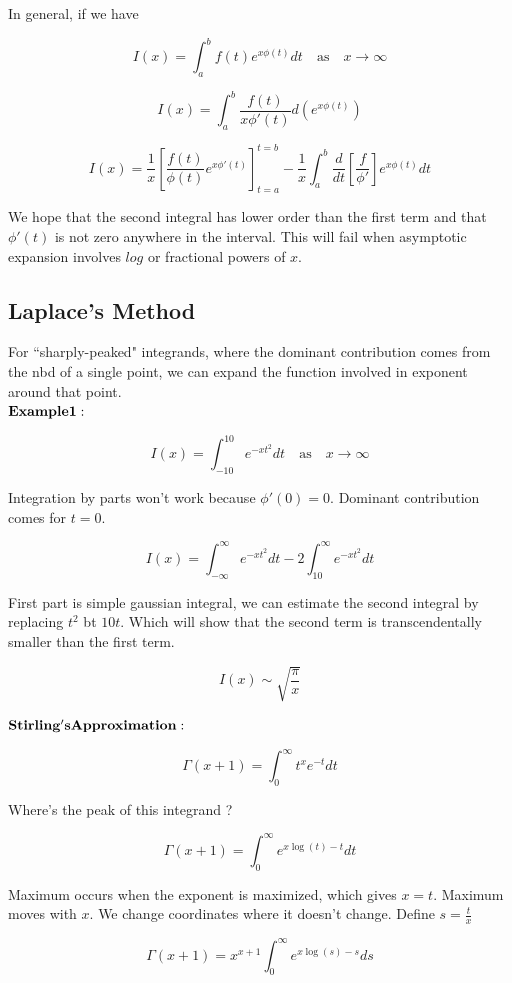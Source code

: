 \documentclass{report}
\begin{document}
\noindent In general, if we have

$$I(x) = \int_{a}^{b} f(t) e^{x\phi(t)} dt \quad\mathrm{as}\quad x\to\infty$$ 

$$I(x) = \int_{a}^{b} \frac{f(t)}{x\phi'(t)} d(e^{x\phi(t)})$$

$$I(x) = \frac{1}{x} \left[\frac{f(t)}{\phi(t)} e^{x\phi'(t)}\right]_{t=a}^{t=b} - \frac{1}{x}\int_{a}^{b}\frac {d}{dt}\left[\frac{f}{\phi'}\right]e^{x\phi(t)}dt $$

We hope that the second integral has lower order than the first term and that $\phi'(t)$ is not zero anywhere in the interval. This will fail when asymptotic expansion involves $log$ or fractional powers of $x$.

\subsection{Laplace's Method}

For ``sharply-peaked" integrands, where the dominant contribution comes from the nbd of a single point, we can expand the function involved in exponent around that point.\\

\noindent $\bold{Example 1 :}$

$$ I(x) = \int_{-10}^{10}e^{-xt^2}dt \quad\mathrm{as}\quad x\to\infty$$

\noindent Integration by parts won't work because $\phi'(0) = 0$. Dominant contribution comes for $t=0$. 

$$I(x) = \int_{-\infty}^{\infty}e^{-xt^2}dt - 2\int_{10}^{\infty}e^{-xt^2}dt$$

\noindent First part is simple gaussian integral, we can estimate the second integral by replacing $t^2$ bt $10t$. Which will show that the second term is transcendentally smaller than the first term.

$$I(x) \sim \sqrt{\frac{\pi}{x}}$$

\noindent $\bold{Stirling's Approximation :}$

$$\Gamma(x+1) = \int_{0}^{\infty}t^x e^{-t}dt$$

\noindent Where's the peak of this integrand ? 

$$ \Gamma(x+1) = \int_{0}^{\infty}e^{x\log(t)-t}dt$$

\noindent Maximum occurs when the exponent is maximized, which gives $x = t$. Maximum moves with $x$. We change coordinates where it doesn't change. Define $ s = \frac{t}{x}$

$$\Gamma(x+1) = x^{x+1}\int_{0}^{\infty}e^{x\log(s) - s}ds$$
\end{document}
